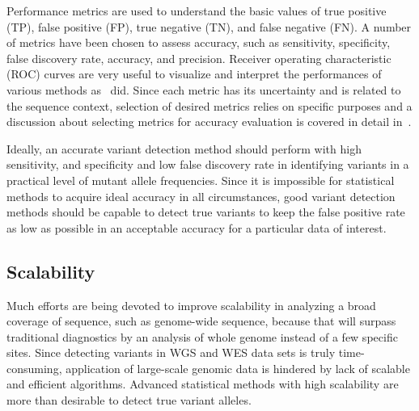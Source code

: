 \documentclass[a4,center,fleqn]{NAR}
\begin{document}
Performance metrics are used to understand the basic values of true positive (TP), false positive (FP), true negative (TN), and false negative (FN).
A number of metrics have been chosen to assess accuracy, such as sensitivity, specificity, false discovery rate, accuracy, and precision.
Receiver operating characteristic (ROC) curves are very useful to visualize and interpret the performances of various methods as~\citep{Xu2014, Huang2015, He2015} did.
Since each metric has its uncertainty and is related to the sequence context, selection of desired metrics relies on specific purposes and a discussion about selecting metrics for accuracy evaluation is covered in detail in~\citep{Olson2015}.

Ideally, an accurate variant detection method should perform with high sensitivity, and specificity and low false discovery rate in identifying variants in a practical level of mutant allele frequencies.
Since it is impossible for statistical methods to acquire ideal accuracy in all circumstances, good variant detection methods should be capable to detect true variants to keep the false positive rate as low as possible in an acceptable accuracy for a particular data of interest.


\subsection{Scalability}

Much efforts are being devoted to improve scalability in analyzing a broad coverage of sequence, such as genome-wide sequence, because that will surpass traditional diagnostics by an analysis of whole genome instead of a few specific sites.
Since detecting variants in WGS and WES data sets is truly time-consuming, application of large-scale genomic data is hindered by lack of scalable and efficient algorithms.
Advanced statistical methods with high scalability are more than desirable to detect true variant alleles.
\end{document}
